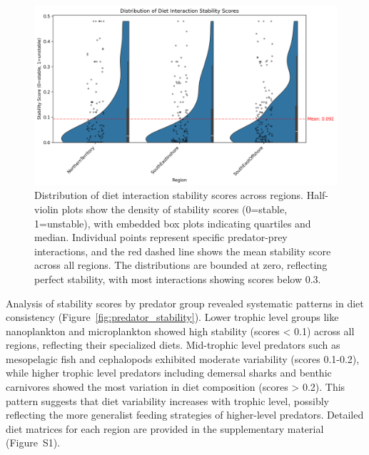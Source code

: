 \begin{figure}[htbp]
    \centering
    \includegraphics[width=\textwidth]{figures/stability_score_distribution.png}
    \caption{Distribution of diet interaction stability scores across regions. Half-violin plots show the density of stability scores (0=stable, 1=unstable), with embedded box plots indicating quartiles and median. Individual points represent specific predator-prey interactions, and the red dashed line shows the mean stability score across all regions. The distributions are bounded at zero, reflecting perfect stability, with most interactions showing scores below 0.3.}
    \label{fig:stability_distribution}
\end{figure}

Analysis of stability scores by predator group revealed systematic patterns in diet consistency (Figure~\ref{fig:predator_stability}). Lower trophic level groups like nanoplankton and microplankton showed high stability (scores < 0.1) across all regions, reflecting their specialized diets. Mid-trophic level predators such as mesopelagic fish and cephalopods exhibited moderate variability (scores 0.1-0.2), while higher trophic level predators including demersal sharks and benthic carnivores showed the most variation in diet composition (scores > 0.2). This pattern suggests that diet variability increases with trophic level, possibly reflecting the more generalist feeding strategies of higher-level predators. Detailed diet matrices for each region are provided in the supplementary material (Figure~S1).

